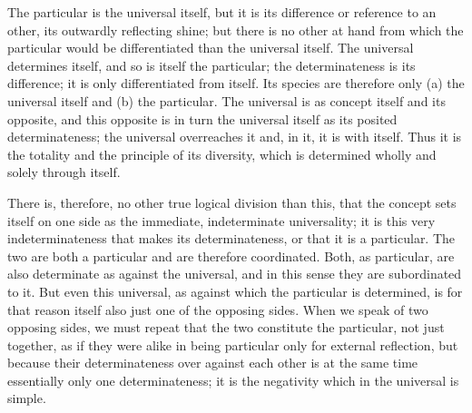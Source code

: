 The particular is the universal itself,
but it is its difference or reference to an other,
its outwardly reflecting shine;
but there is no other at hand from which
the particular would be differentiated
than the universal itself.
The universal determines itself,
and so is itself the particular;
the determinateness is its difference;
it is only differentiated from itself.
Its species are therefore
only (a) the universal itself
and (b) the particular.
The universal is as concept itself and its opposite,
and this opposite is in turn the universal itself
as its posited determinateness;
the universal overreaches it
and, in it, it is with itself.
Thus it is the totality and the principle of its diversity,
which is determined wholly and solely through itself.

There is, therefore, no other
true logical division than this,
that the concept sets itself on one side
as the immediate, indeterminate universality;
it is this very indeterminateness
that makes its determinateness,
or that it is a particular.
The two are both a particular
and are therefore coordinated.
Both, as particular, are also
determinate as against the universal,
and in this sense they are subordinated to it.
But even this universal,
as against which the particular is determined,
is for that reason itself also
just one of the opposing sides.
When we speak of two opposing sides,
we must repeat that the two constitute the particular,
not just together, as if they were alike
in being particular only for external reflection,
but because their determinateness over against each other is
at the same time essentially only one determinateness;
it is the negativity which in the universal is simple.

